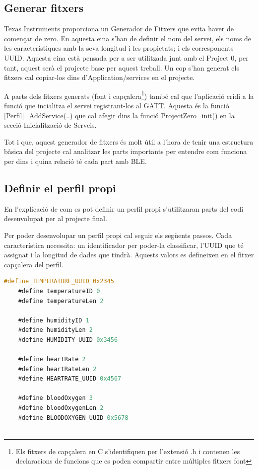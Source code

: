 \subsection{Generar fitxers}
Texas Instruments proporciona un Generador de Fitxers \cite{Service_Generator} que evita haver de començar de zero.
En aquesta eina s'han de definir el nom del servei, els noms de les característiques amb la seva longitud i les propietats; i els corresponents UUID.
Aquesta eina està pensada per a ser utilitzada junt amb el Project 0, per tant, aquest serà el projecte base per aquest treball.
Un cop s'han generat els fitxers cal copiar-los dins d'Application/services en el projecte.

A parts dels fitxers generats (font i capçalera\footnote{Els fitxers de capçalera en C s'identifiquen per l'extensió .h i contenen les declaracions de funcions que es poden compartir entre múltiples fitxers font}) també cal que l'aplicació cridi a la funció que incialitza el servei registrant-los al GATT.
Aquesta és la funció [Perfil]\_AddService(..) que cal afegir dins la funció ProjectZero\_init() en la secció Inicialització de Serveis.

Tot i que, aquest generador de fitxers és molt útil a l'hora de tenir una estructura bàsica del projecte cal analitzar les parts importants per entendre com funciona per dins i quina relació té cada part amb BLE.

\subsection{Definir el perfil propi}
En l'explicació de com es pot definir un perfil propi s'utilitzaran parts del codi desenvolupat per al projecte final.

Per poder desenvolupar un perfil propi cal seguir els següents passos.
Cada característica necessita: un identificador per poder-la classificar, l'UUID que té assignat i la longitud de dades que tindrà.
Aquests valors es defineixen en el fitxer capçalera del perfil.

\begin{lstlisting}[language=C]
	#define TEMPERATURE_UUID 0x2345
	#define temperatureID 0
	#define temperatureLen 2
	
	#define humidityID 1
	#define humidityLen 2
	#define HUMIDITY_UUID 0x3456
	
	#define heartRate 2
	#define heartRateLen 2
	#define HEARTRATE_UUID 0x4567
	
	#define bloodOxygen 3
	#define bloodOxygenLen 2
	#define BLOODOXYGEN_UUID 0x5678
	
\end{lstlisting}

